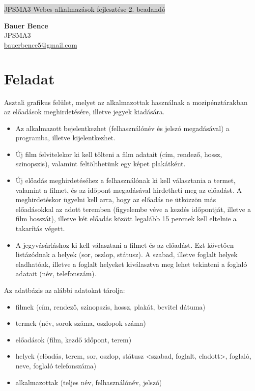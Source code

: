 \documentclass[11pt,a4paper]{article}
\begin{document}
\renewcommand{\labelitemi}{\textbullet}
\def\br{\\[0.1cm]}
\thispagestyle{empty}
\begin{center}
	\colorbox{lightgray}{{\large JPSMA3} \hspace{3cm} {\large Webes alkalmazások fejlesztése 2. beadandó} \hspace{5cm} \thepage}
\end{center}
\begin{framed}
	\begin{flushleft}
		{\large \textbf{Bauer Bence}}
		\hspace{5.4cm}{\large 2019.05.12.}\br
		{\large JPSMA3}\br
		{\large \href{mailto:bauerbence5@gmail.com}{bauerbence5@gmail.com}}
	\end{flushleft}
\end{framed}
\section{Feladat}
Asztali grafikus felület, melyet az alkalmazottak használnak a
mozipénztárakban az előadások meghirdetésére, illetve jegyek kiadására.
\begin{itemize}
\item Az alkalmazott bejelentkezhet (felhasználónév és jelszó megadásával) a
programba, illetve kijelentkezhet.
\item Új film felvitelekor ki kell tölteni a film adatait (cím, rendező,
hossz, szinopszis), valamint feltölthetünk egy képet plakátként.
\item Új előadás meghirdetéséhez a felhasználónak ki kell választania a termet,
valamint a filmet, és az időpont megadásával hirdetheti meg az előadást. A
meghirdetéskor ügyelni kell arra, hogy az előadás ne ütközzön más
előadásokkal az adott teremben (figyelembe véve a kezdés időpontját, illetve
a film hosszát), illetve két előadás között legalább 15 percnek kell eltelnie a
takarítás végett.
\item A jegyvásárláshoz ki kell választani a filmet és az előadást. Ezt követően
listázódnak a helyek (sor, oszlop, státusz). A szabad, illetve foglalt helyek
eladhatóak, illetve a foglalt helyeket kiválasztva meg lehet tekinteni a foglaló
adatait (név, telefonszám).
\end{itemize}
Az adatbázis az alábbi adatokat tárolja:
\begin{itemize}
\item filmek (cím, rendező, szinopszis, hossz, plakát, bevitel dátuma)
\item termek (név, sorok száma, oszlopok száma)
\item előadások (film, kezdő időpont, terem)
\item helyek (előadás, terem, sor, oszlop, státusz
<szabad, foglalt, eladott>, foglaló, neve, foglaló telefonszáma)
\item alkalmazottak (teljes név, felhasználónév, jelszó)
\end{itemize}
\end{document}
